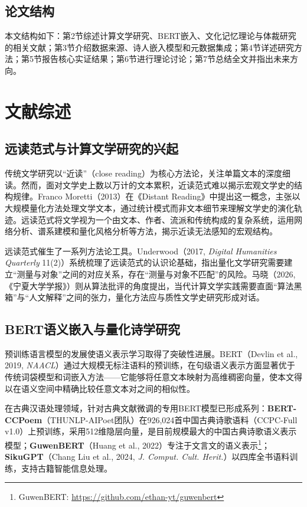 \documentclass[12pt,a4paper]{article}
\numberwithin{equation}{section}
\begin{document}
\subsection{论文结构}

本文结构如下：第2节综述计算文学研究、BERT嵌入、文化记忆理论与体裁研究的相关文献；第3节介绍数据来源、诗人嵌入模型和元数据集成；第4节详述研究方法；第5节报告核心实证结果；第6节进行理论讨论；第7节总结全文并指出未来方向。

\section{文献综述}

\subsection{远读范式与计算文学研究的兴起}

传统文学研究以“近读”（close reading）为核心方法论，关注单篇文本的深度细读。然而，面对文学史上数以万计的文本累积，近读范式难以揭示宏观文学史的结构规律。Franco Moretti（2013）在《Distant Reading》中提出这一概念，主张以大规模量化方法处理文学文本，通过统计模式而非文本细节来理解文学史的演化轨迹。远读范式将文学视为一个由文本、作者、流派和传统构成的复杂系统，运用网络分析、谱系建模和量化风格分析等方法，揭示近读无法感知的宏观结构。

远读范式催生了一系列方法论工具。Underwood（2017, \textit{Digital Humanities Quarterly} 11(2)）系统梳理了远读范式的认识论基础，指出量化文学研究需要建立“测量与对象”之间的对应关系，存在“测量与对象不匹配”的风险。马晓（2026, 《宁夏大学学报》）则从算法批评的角度提出，当代计算文学实践需要直面“算法黑箱”与“人文解释”之间的张力，量化方法应与质性文学史研究形成对话。

\subsection{BERT语义嵌入与量化诗学研究}

预训练语言模型的发展使语义表示学习取得了突破性进展。BERT（Devlin et al., 2019, \textit{NAACL}）通过大规模无标注语料的预训练，在句级语义表示方面显著优于传统词袋模型和词嵌入方法——它能够将任意文本映射为高维稠密向量，使本文得以在语义空间中精确比较任意文本对之间的相似性。

在古典汉语处理领域，针对古典文献微调的专用BERT模型已形成系列：\textbf{BERT-CCPoem}（THUNLP-AIPoet团队）在926,024首中国古典诗歌语料（CCPC-Full v1.0）上预训练，采用512维隐层向量，是目前规模最大的中国古典诗歌语义表示模型；\textbf{GuwenBERT}（Huang et al., 2022）专注于文言文的语义表示\footnote{GuwenBERT: \url{https://github.com/ethan-yt/guwenbert}}；\textbf{SikuGPT}（Chang Liu et al., 2024, \textit{J. Comput. Cult. Herit.}）以四库全书语料训练，支持古籍智能信息处理。
\end{document}
